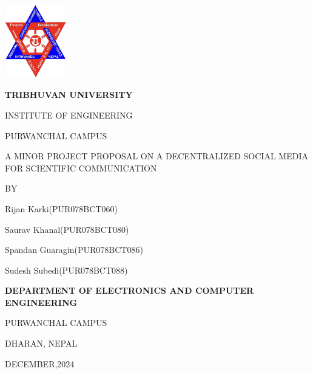 \begin{titlepage}
    \centering
    
    \includegraphics[width=0.2\textwidth]{Graphics/TULogo.png}\par
    \vspace{1.2cm}
    {\fontsize{14pt}{12pt}\selectfont\bfseries\textcolor{black}
    TRIBHUVAN UNIVERSITY \par INSTITUTE OF ENGINEERING \par PURWANCHAL CAMPUS \par
    \vspace{1.2cm}
    \begin{flushleft}
    
    \end{flushleft}

    \par A MINOR PROJECT PROPOSAL ON A DECENTRALIZED SOCIAL MEDIA FOR SCIENTIFIC COMMUNICATION\par

    \vspace{1.2cm}
    BY\par Rijan Karki(PUR078BCT060)
      \par Saurav Khanal(PUR078BCT080)
      \par Spandan Guaragin(PUR078BCT086)
      \par Sudesh Subedi(PUR078BCT088)
    \vspace{1.2cm}\par
    }
    {\fontsize{13pt}{12pt}\selectfont\bfseries\textcolor{black}
    DEPARTMENT OF ELECTRONICS AND COMPUTER ENGINEERING\par PURWANCHAL CAMPUS\par DHARAN, NEPAL\par
    \vspace{1.2cm}
    \vspace{1.2cm}
    
    DECEMBER,2024 
    }
\end{titlepage}
